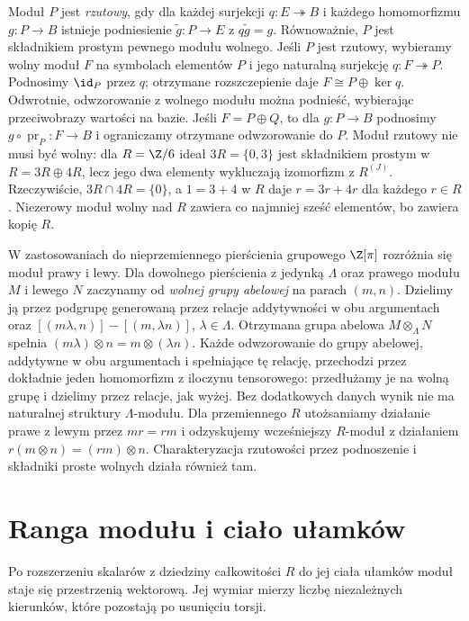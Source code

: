 \begin{uwaga}
\label{uwaga:moduly-projektywne}
Moduł $P$ jest \emph{rzutowy}, gdy dla każdej
surjekcji $q:E\twoheadrightarrow B$ i każdego
homomorfizmu $g:P\to B$ istnieje podniesienie
$\widetilde g:P\to E$ z $q\widetilde g=g$.
Równoważnie, $P$ jest składnikiem prostym
pewnego modułu wolnego. Jeśli $P$ jest rzutowy,
wybieramy wolny moduł $F$ na symbolach elementów
$P$ i jego naturalną surjekcję $q:F\twoheadrightarrow P$.
Podnosimy $\id_P$ przez $q$; otrzymane rozszczepienie
daje $F\cong P\oplus\ker q$. Odwrotnie,
odwzorowanie z wolnego modułu można podnieść,
wybierając przeciwobrazy wartości na bazie.
Jeśli $F=P\oplus Q$, to dla $g:P\to B$
podnosimy $g\circ\operatorname{pr}_P:F\to B$
i ograniczamy otrzymane odwzorowanie do $P$.
Moduł rzutowy nie musi być wolny: dla
$R=\Z/6$ ideał $3R=\{0,3\}$ jest składnikiem
prostym w $R=3R\oplus4R$, lecz jego dwa
elementy wykluczają izomorfizm z $R^{(J)}$.
Rzeczywiście, $3R\cap4R=\{0\}$, a $1=3+4$ w $R$ daje
$r=3r+4r$ dla każdego $r\in R$. Niezerowy moduł wolny
nad $R$ zawiera co najmniej sześć elementów, bo zawiera kopię $R$.
\end{uwaga}

W zastosowaniach do nieprzemiennego pierścienia
grupowego $\Z[\pi]$ rozróżnia się moduł prawy
i lewy. Dla dowolnego pierścienia z jedynką $\Lambda$
oraz prawego modułu $M$ i lewego $N$ zaczynamy od
\emph{wolnej grupy abelowej} na parach $(m,n)$.
Dzielimy ją przez podgrupę generowaną przez relacje
addytywności w obu argumentach oraz
$[(m\lambda,n)]-[(m,\lambda n)]$, $\lambda\in\Lambda$.
Otrzymana grupa abelowa $M\otimes_\Lambda N$ spełnia
$(m\lambda)\otimes n=m\otimes(\lambda n)$.
Każde odwzorowanie do grupy abelowej, addytywne w obu
argumentach i spełniające tę relację, przechodzi przez
dokładnie jeden homomorfizm z iloczynu tensorowego: przedłużamy je
na wolną grupę i dzielimy przez relacje, jak wyżej.
Bez dodatkowych danych wynik nie ma naturalnej struktury
$\Lambda$-modułu. Dla przemiennego $R$ utożsamiamy działanie
prawe z lewym przez $mr=rm$ i odzyskujemy wcześniejszy
$R$-moduł z działaniem $r(m\otimes n)=(rm)\otimes n$.
Charakteryzacja rzutowości przez podnoszenie i
składniki proste wolnych działa również tam.

\section{Ranga modułu i ciało ułamków}
\label{sec:ranga-modulu}

Po rozszerzeniu skalarów z dziedziny całkowitości $R$ do jej
ciała ułamków moduł staje się przestrzenią wektorową. Jej wymiar
mierzy liczbę niezależnych kierunków, które pozostają po usunięciu
torsji.

